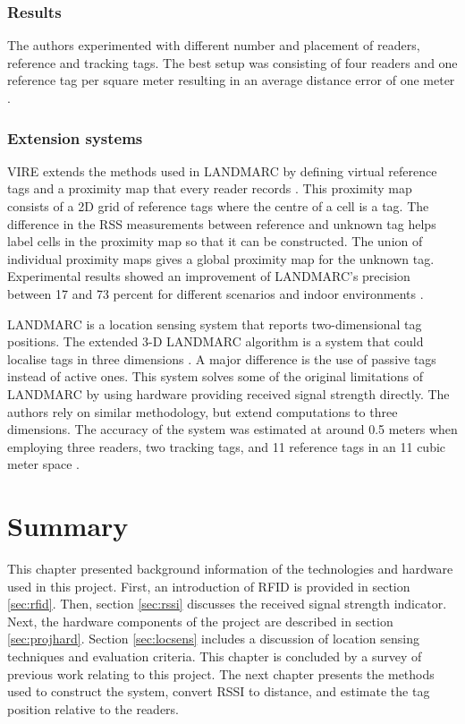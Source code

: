 \subsubsection{Results}

The authors experimented with different number and placement of readers, reference and tracking tags. The best setup was consisting of four readers and one reference tag per square meter resulting in an average distance error of one meter \cite{Ni2004}.

\subsubsection{Extension systems}

VIRE extends the methods used in LANDMARC by defining virtual reference tags and a proximity map that every reader records \cite{Zhao2007}. This proximity map consists of a 2D grid of reference tags where the centre of a cell is a tag. The difference in the RSS measurements between reference and unknown tag helps label cells in the proximity map so that it can be constructed. The union of individual proximity maps gives a global proximity map for the unknown tag. Experimental results showed an improvement of LANDMARC's precision between 17 and 73 percent for different scenarios and indoor environments \cite{Zhao2007}.

LANDMARC is a location sensing system that reports two-dimensional tag positions. The extended 3-D LANDMARC algorithm is a system that could localise tags in three dimensions \cite{Khan2009}. A major difference is the use of passive tags instead of active ones. This system solves some of the original limitations of LANDMARC by using hardware providing received signal strength directly. The authors rely on similar methodology, but extend computations to three dimensions. The accuracy of the system was estimated at around 0.5 meters when employing three readers, two tracking tags, and 11 reference tags in an 11 cubic meter space \cite{Khan2009}.


\section{Summary}

This chapter presented background information of the technologies and hardware used in this project. First, an introduction of RFID is provided in section \ref{sec:rfid}.  Then, section \ref{sec:rssi} discusses the received signal strength indicator. Next, the hardware components of the project are described in section \ref{sec:projhard}. Section \ref{sec:locsens} includes a discussion of location sensing techniques and evaluation criteria. This chapter is concluded by a survey of previous work relating to this project. The next chapter presents the methods used to construct the system, convert RSSI to distance, and estimate the tag position relative to the readers.
